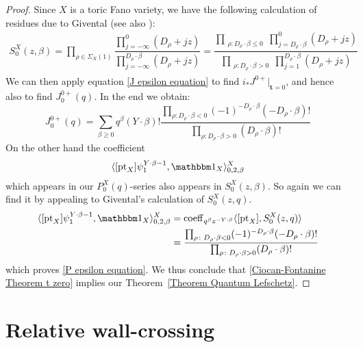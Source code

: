 \documentclass[10pt]{amsart}
\newcommand{\pt}{\operatorname{pt}}
\theoremstyle{definition}
\theoremstyle{definition}
\begin{document}
\begin{proof}
Since $X$ is a toric Fano variety, we have the following calculation of residues due to Givental \cite{Givental-mirror} (see also \cite[Definition 7.2.8]{CF-K}):
\begin{align*}
S_0^X(z,\beta) =\prod_{\rho\in\Sigma_X(1)}\dfrac{\prod_{j=-\infty}^0(D_{\rho}+jz)}{\prod_{j=-\infty}^{D_{\rho}\cdot \beta}(D_\rho+jz)}
=\dfrac{\prod_{\substack{\rho \colon D_\rho \cdot \beta\leq 0}} \prod_{j=D_\rho \cdot \beta}^0 (D_{\rho}+jz)}{\prod_{\substack{\rho\colon D_\rho \cdot\beta > 0}} \prod_{j=1}^{D_\rho\cdot\beta} (D_{\rho}+jz)}
\end{align*}
We can then apply equation \eqref{J epsilon equation} to find $i_*J^{0+}|_{\mathbf{t}=0}$, and hence also to find $J^{0+}_0(q)$. In the end we obtain:
\begin{equation*}
 J^{0+}_0(q)=\sum_{\beta\geq 0}q^\beta(Y\cdot\beta)!\frac{\prod_{\rho\colon D_\rho\cdot\beta< 0}(-1)^{-D_{\rho}\cdot\beta}(-D_{\rho}\cdot\beta)!}{\prod_{\rho\colon D_\rho\cdot\beta> 0}(D_{\rho}\cdot\beta)!}
\end{equation*}
On the other hand the coefficient
\begin{equation*} \langle[\pt_X]\psi_1^{Y\cdot\beta-1},\mathbbm 1_X\rangle_{0,2,\beta}^X\end{equation*}
which appears in our $P_0^X(q)$-series also appears in $S_0^X(z,\beta)$. So again we can find it by appealing to Givental's calculation of $S_0^X(z,q)$.
\begin{align*}
 \langle[\pt_X]\psi_1^{Y\cdot\beta-1},\mathbbm 1_X\rangle_{0,2,\beta}^X &=\operatorname{coeff}_{q^\beta z^{-Y\cdot\beta}}\langle [\pt_X],S_0^X(z,q) \rangle\\
& =\frac{\prod_{\rho\colon D_\rho\cdot\beta< 0}(-1)^{-D_{\rho}\cdot\beta}(-D_{\rho}\cdot\beta)!}{\prod_{\rho\colon D_\rho\cdot\beta> 0}(D_{\rho}\cdot\beta)!}
\end{align*}
which proves \eqref{P epsilon equation}. We thus conclude that \eqref{Ciocan-Fontanine Theorem t zero} implies our Theorem~\ref{Theorem Quantum Lefschetz}. \end{proof}

\section{Relative wall-crossing}
\end{document}
